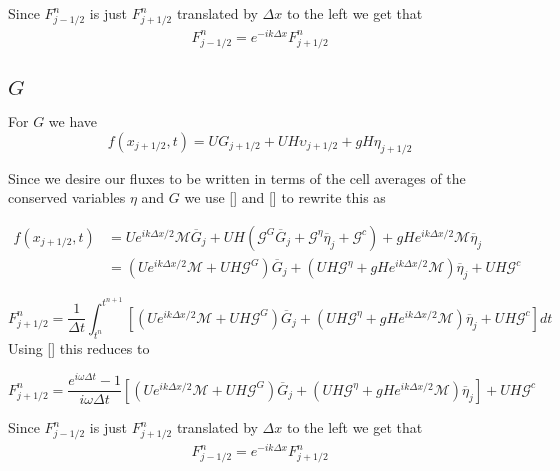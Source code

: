 \documentclass[12pt]{article}
\begin{document}
Since $F^n_{j-1/2} $ is just $F^n_{j+1/2} $ translated by $\Delta x$ to the left we get that
\begin{align}
F^n_{j-1/2}  =  e^{-ik\Delta x}F^n_{j+1/2}
\end{align}


\subsection{$G$}

For $G$ we have 
\[f(x_{j+1/2},t) = UG_{j+1/2} + UH \upsilon_{j+1/2} + gH \eta_{j+1/2}\]

Since we desire our fluxes to be written in terms of the cell averages of the conserved variables $\eta$ and $G$ we use [] and [] to rewrite this as

\begin{align}
f(x_{j+1/2},t) &= Ue^{i {k\Delta x}/{2}}\mathcal{M} \overline{G}_j + UH\left(\mathcal{G}^G \overline{G}_j + \mathcal{G}^\eta \overline{\eta}_j + \mathcal{G}^c\right) + gH e^{i {k\Delta x}/{2}}\mathcal{M} \overline{\eta}_j \\ &= \left(Ue^{i {k\Delta x}/{2}}\mathcal{M} + UH \mathcal{G}^G \right) \overline{G}_j + \left(UH\mathcal{G}^\eta + gH e^{i {k\Delta x}/{2}}\mathcal{M} \right)\overline{\eta}_j + UH\mathcal{G}^c
\end{align}

\begin{equation}
F^n_{j+1/2} = \frac{1}{\Delta t} \int_{t^n}^{t^{n+1}}\left[ \left(Ue^{i {k\Delta x}/{2}}\mathcal{M} + UH \mathcal{G}^G \right) \overline{G}_j + \left(UH\mathcal{G}^\eta + gH e^{i {k\Delta x}/{2}}\mathcal{M} \right)\overline{\eta}_j + UH\mathcal{G}^c\right] dt
\end{equation}
Using [] this reduces to


\begin{equation}
F^n_{j+1/2} = \frac{e^{i\omega \Delta t} -1}{i\omega\Delta t}\left[ \left(Ue^{i {k\Delta x}/{2}}\mathcal{M} + UH \mathcal{G}^G \right) \overline{G}_j + \left(UH\mathcal{G}^\eta + gH e^{i {k\Delta x}/{2}}\mathcal{M} \right)\overline{\eta}_j \right]+ UH\mathcal{G}^c
\end{equation}

Since $F^n_{j-1/2} $ is just $F^n_{j+1/2} $ translated by $\Delta x$ to the left we get that
\begin{align}
F^n_{j-1/2}  =  e^{-ik\Delta x}F^n_{j+1/2}
\end{align}
\end{document}
